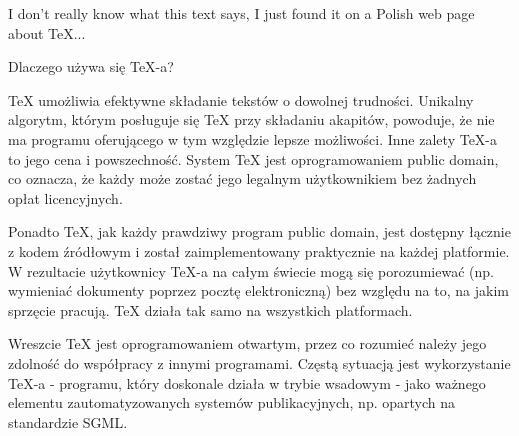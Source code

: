 \documentclass{article}
\begin{document}
\cursive
\calseries\slshape

I don't really know what this text says, I just found it on a Polish web page
about TeX...

\bigskip

\noindent
Dlaczego używa się TeX-a?
\smallskip

TeX umożliwia efektywne składanie tekstów o dowolnej trudności. Unikalny
algorytm, którym posługuje się TeX przy składaniu akapitów, powoduje, że nie
ma programu oferującego w tym względzie lepsze możliwości. Inne zalety TeX-a
to jego cena i powszechność. System TeX jest oprogramowaniem public domain, co
oznacza, że każdy może zostać jego legalnym użytkownikiem bez żadnych opłat
licencyjnych.

Ponadto TeX, jak każdy prawdziwy program public domain, jest dostępny łącznie
z kodem źródłowym i został zaimplementowany praktycznie na każdej platformie.
W rezultacie użytkownicy TeX-a na całym świecie mogą się porozumiewać (np.
wymieniać dokumenty poprzez pocztę elektroniczną) bez względu na to, na jakim
sprzęcie pracują. TeX działa tak samo na wszystkich platformach.

Wreszcie TeX jest oprogramowaniem otwartym, przez co rozumieć należy jego
zdolność do współpracy z innymi programami. Częstą sytuacją jest wykorzystanie
TeX-a - programu, który doskonale działa w trybie wsadowym - jako ważnego
elementu zautomatyzowanych systemów publikacyjnych, np. opartych na
standardzie SGML. 
\end{document}
